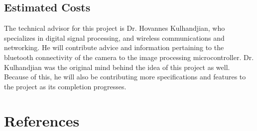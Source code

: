 \documentclass{IEEEtran}					%
\begin{document}
	\subsection{Estimated Costs}
	\begin{table} [h!]	
		\centering
		\caption{Estimated costs of components for project}
		\label{table:1}
	\end{table}		
	The technical advisor for this project is Dr. Hovannes Kulhandjian, who specializes in digital signal processing, and wireless communications and networking.	He will contribute advice and information pertaining to the bluetooth connectivity of the camera to the image processing microcontroller. Dr. Kulhandjian was the original mind behind the idea of this project as well. Because of this, he will also be contributing more specifications and features to the project as its completion progresses. 			
	\section*{References}
	
\end{document}
